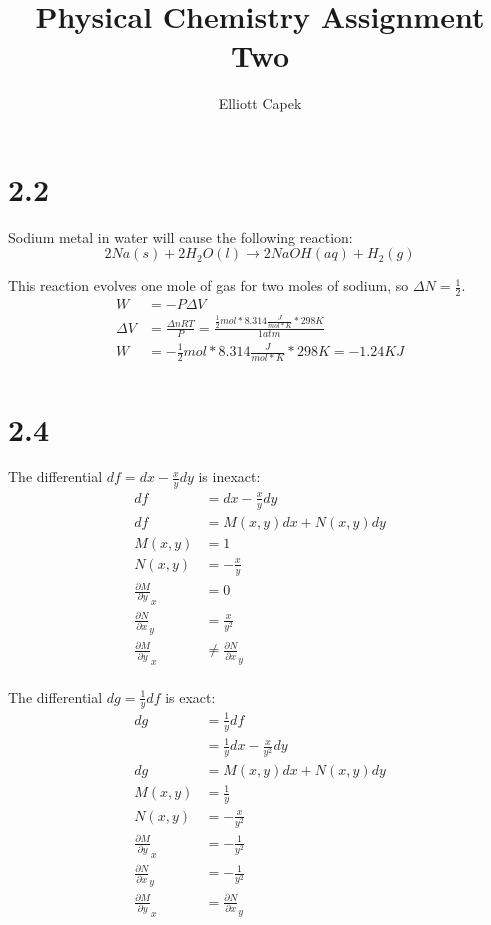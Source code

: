 \documentclass[10pt]{article} %
\title{Physical Chemistry Assignment Two}
\author{Elliott Capek}
\begin{document}
\maketitle{}

\section{2.2}
Sodium metal in water will cause the following reaction:
\begin{equation}
  2Na(s) + 2H_2O(l) \rightarrow 2NaOH (aq) + H_2(g)
\end{equation}

This reaction evolves one mole of gas for two moles of sodium, so $\Delta N = \frac{1}{2}$.\\

\begin{align}
  W &= -P\Delta V\\
  \Delta V &= \frac{\Delta nRT}{P} = \frac{\frac{1}{2} mol * 8.314 \frac{J}{mol * K} * 298K}{1 atm}\\
  W &= -\frac{1}{2} mol * 8.314 \frac{J}{mol * K} * 298K = -1.24KJ\\
\end{align}

\section{2.4}

The differential $df = dx - \frac{x}{y}dy$ is inexact:
\begin{align}
  df &= dx - \frac{x}{y}dy\\
  df &= M(x,y)dx + N(x,y)dy\\
  M(x,y) &= 1\\
  N(x,y) &= -\frac{x}{y}\\
  \frac{\partial M}{\partial y}_x &= 0\\
  \frac{\partial N}{\partial x}_y &= \frac{x}{y^2}\\
  \frac{\partial M}{\partial y}_x &\neq \frac{\partial N}{\partial x}_y\\
\end{align}

The differential $dg = \frac{1}{y}df$ is exact:
\begin{align}
  dg &= \frac{1}{y}df\\
     &= \frac{1}{y}dx - \frac{x}{y^2}dy\\
  dg &= M(x,y)dx + N(x,y)dy\\
  M(x,y) &= \frac{1}{y}\\
  N(x,y) &= -\frac{x}{y^2}\\
  \frac{\partial M}{\partial y}_x &= -\frac{1}{y^2}\\
  \frac{\partial N}{\partial x}_y &= -\frac{1}{y^2}\\
  \frac{\partial M}{\partial y}_x &= \frac{\partial N}{\partial x}_y\\
\end{align}
\end{document}
